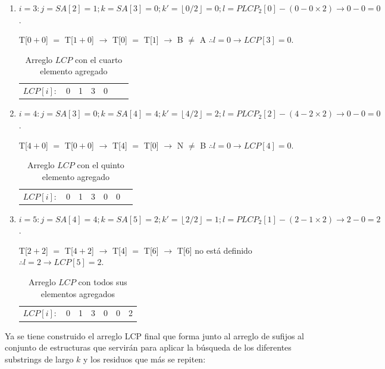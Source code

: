 \begin{enumerate}
\item $i=3: j=SA[2]=1; k=SA[3]=0; k'= \left \lfloor{0/2}\right \rfloor = 0; l= PLCP_{2}[0] - (0-0 \times 2) \rightarrow 0-0=0$.

T[$0+0$] $=$ T[$1+0$] $\rightarrow$ T[$0$] $=$ T[$1$] $\rightarrow$ B $\neq$ A $\therefore l=0 \rightarrow LCP[3] = 0$.

\begin{table}[!htb]
\centering
\begin{tabular}{c|c|c|c|c|c|c|}
\cline{2-7}
$LCP[i]:$ & 0 & 1 & 3 & 0 &  & \\ \cline{2-7}
\end{tabular}
\caption{Arreglo $LCP$ con el cuarto elemento agregado}
\end{table}

\item $i=4: j=SA[3]=0; k=SA[4]=4; k'= \left \lfloor{4/2}\right \rfloor = 2; l= PLCP_{2}[2] - (4-2 \times 2) \rightarrow 0-0=0$.

T[$4+0$] $=$ T[$0+0$] $\rightarrow$ T[$4$] $=$ T[$0$] $\rightarrow$ N $\neq$ B $\therefore l=0 \rightarrow LCP[4] = 0$.

\begin{table}[!htb]
\centering
\begin{tabular}{c|c|c|c|c|c|c|}
\cline{2-7}
$LCP[i]:$ & 0 & 1 & 3 & 0 & 0 & \\ \cline{2-7}
\end{tabular}
\caption{Arreglo $LCP$ con el quinto elemento agregado}
\end{table}

\item $i=5: j=SA[4]=4; k=SA[5]=2; k'= \left \lfloor{2/2}\right \rfloor = 1; l= PLCP_{2}[1] - (2-1 \times 2) \rightarrow 2-0=2$.

T[$2+2$] $=$ T[$4+2$] $\rightarrow$ T[$4$] $=$ T[$6$] $\rightarrow$ T[$6$] no está definido $\therefore l=2 \rightarrow LCP[5] = 2$.

\begin{table}[!htb]
\centering
\begin{tabular}{c|c|c|c|c|c|c|}
\cline{2-7}
$LCP[i]:$ & 0 & 1 & 3 & 0 & 0 & 2 \\ \cline{2-7}
\end{tabular}
\caption{Arreglo $LCP$ con todos sus elementos agregados}
\end{table}

\end{enumerate}

Ya se tiene construido el arreglo LCP final que forma junto al arreglo de sufijos al conjunto de estructuras que servirán para aplicar la búsqueda de los diferentes substrings de largo $k$ y los residuos que más se repiten:

